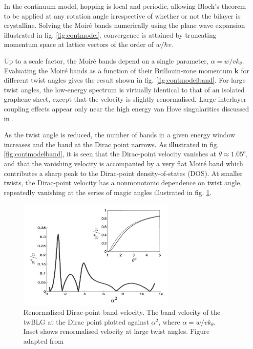 In the continuum model, hopping is local and periodic, allowing Bloch’s theorem to be applied at any rotation angle irrespective of whether or not the bilayer is crystalline. Solving the Moiré bands numerically using the plane wave expansion illustrated in fig. \ref{fig:contmodel}, convergence is attained by truncating momentum space at lattice vectors of the order of $w/\hbar v$. 

Up to a scale factor, the Moiré bands depend on a single parameter, $\alpha=w/vk_\theta$. Evaluating the Moiré bands as a function of their Brillouin-zone momentum $\mathbf{k}$ for different twist angles gives the result shown in fig. \ref{fig:contmodelband}. For large twist angles, the low-energy spectrum is virtually identical to that of an isolated graphene sheet, except that the velocity is slightly renormalised. Large interlayer coupling effects appear only near the high energy van Hove singularities discussed in \cite{Li2010}.

As the twist angle is reduced, the number of bands in a given energy window increases and the band at the Dirac point narrows. As illustrated in fig. \ref{fig:contmodelband}, it is seen that the Dirac-point velocity vanishes at $\theta \approx 1.05^o$, and that the vanishing velocity is accompanied by a very flat Moiré band which contributes a sharp peak to the Dirac-point density-of-states (DOS). At smaller twists, the Dirac-point velocity has a nonmonotonic dependence on twist angle, repeatedly vanishing at the series of magic angles illustrated in fig. \ref{fig:contmodelvel}.

\begin{figure}[H]
	\centering
	\includegraphics[width=0.7\textwidth]{figures/contmodelvel.jpg}
	\caption{Renormalized Dirac-point band velocity. The band velocity of the twBLG at the Dirac point plotted against $\alpha^2$, where $\alpha=w/vk_\theta$. Inset shows renormalised velocity at large twist angles. Figure adapted from \cite{Bistritzer12233}}
	\label{fig:contmodelvel}
\end{figure}

